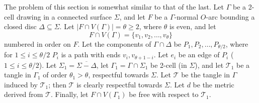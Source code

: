 
The problem of this section is somewhat similar to that of the last. Let $\Gamma$ be a 2-cell drawing in a connected surface $\Sigma$, and let $F$ be a $\Gamma$-normal $O$-arc bounding a closed disc $\Delta \subseteq \Sigma$. Let $|F \cap V(\Gamma)| = \theta \ge 2$, where $\theta$ is even, and let
\begin{equation*}
F \cap V(\Gamma) = \{v_1, v_2, \dots, v_\theta\}
\end{equation*}
numbered in order on $F$. Let the components of $\Gamma \cap \Delta$ be $P_1, P_2, \dots, P_{\theta/2}$, where for $1 \le i \le \theta/2$ $P_i$ is a path with ends $v_i, v_{\theta+1-i}$. Let $e_i$ be an edge of $P_i$ ($1 \le i \le \theta/2$). Let $\Sigma_1 = \overline{\Sigma - \Delta}$, let $\Gamma_1 = \Gamma \cap \Sigma_1$ be 2-cell (in $\Sigma$), and let $\mathscr{T}_1$ be a tangle in $\Gamma_1$ of order $\theta_1 > \theta$, respectful towards $\Sigma$. Let $\mathscr{T}$ be the tangle in $\Gamma$ induced by $\mathscr{T}_1$; then $\mathscr{T}$ is clearly respectful towards $\Sigma$. Let $d$ be the metric derived from $\mathscr{T}$. Finally, let $F \cap V(\Gamma_1)$ be free with respect to $\mathscr{T}_1$.
